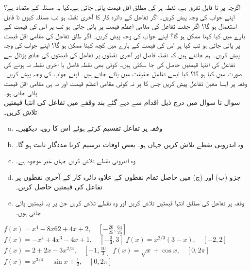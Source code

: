 اگرچہ  پر  نا قابل تفرق ہے،  نقطہ   پر  کی مطلق اقل قیمت پائی جاتی ہے۔کیا یہ مسئلہ  کے متضاد ہے؟ اپنے جواب کی وجہ پیش کریں۔
اگر تفاعل کے دائرہ کار کا آخری نقطہ  ہو تب مسئلہ  کیوں نا قابل استعمال ہو گا؟
اگر جفت تفاعل  کی مقامی اعظم قیمت  پر پائی جاتی ہو تب  پر اس کی قیمت کے بارے میں کیا کہنا ممکن ہو گا؟ اپنے جواب کی وجہ پیش کریں۔ 
اگر طاق تفاعل  کی مقامی اقل  قیمت  پر پائی جاتی ہو تب کیا   پر اس کی قیمت کے بارے میں کچھ کہنا ممکن ہو گا؟ اپنے جواب کی وجہ پیش کریں۔ 
ہم جانتے ہیں کہ نقطہ فاصل اور آخری نقطوں پر تفاعل  کی قیمتوں کی جانچ پڑتال سے تفاعل کی انتہا قیمتیں حاصل کی جا سکتی ہیں۔ کوئی بھی نقطہ فاصل یا آخری نقطہ نہ ہونے کی صورت میں کیا ہو گا؟ کیا ایسے تفاعل حقیقت میں پائے جاتے ہیں۔ اپنے جواب کی وجہ پیش کریں۔
وقفہ  پر ایسا معین تفاعل پیش کریں جس کا  پر نہ کوئی مقامی اعظم قیمت اور نہ ہی مقامی اقل قیمت پائی جاتی ہو۔
\\
سوال  تا سوال  میں درج ذیل اقدام سے دیے گئے بند وقفے  میں تفاعل کی انتہا قیمتیں تلاش کریں۔
\begin{enumerate}[a.]
\item
وقفہ  پر تفاعل تقسیم کرتے ہوئے اس کا رویہ دیکھیں۔
\item
 وہ اندرونی نقطے تلاش کریں جہاں  ہو۔ بعض اوقات  ترسیم  کرنا مددگار ثابت ہو گا۔
\item
وہ اندرونی نقطے تلاش کریں جہاں  غیر موجود ہے۔
\item
جزو (ب) اور (ج) میں حاصل تمام نقطوں کے علاوہ دائرہ کار کے آخری نقطوں پر تفاعل کی قیمتیں حاصل کریں۔
\item
وقفہ پر تفاعل کی مطلق انتہا قیمتیں تلاش کریں  اور  وہ نقطے تلاش کریں جن  پر یہ قیمتیں پائی جاتی ہوں۔ 

\end{enumerate}

$f(x)=x^4-8x62+4x+2,\quad [-\tfrac{20}{25},\tfrac{64}{25}]$
$f(x)=-x^4+4x^3-4x+1,\quad [-\tfrac{3}{4},3]$
$f(x)=x^{2/3}(3-x),\quad [-2,2]$
$f(x)=2+2x-3x^{2/3},\quad [-1,\tfrac{10}{3}]$
$f(x)=\sqrt{x}+\cos x,\quad [0,2\pi]$
$f(x)=x^{3/4}-\sin x+\tfrac{1}{2},\quad [0,2\pi]$

